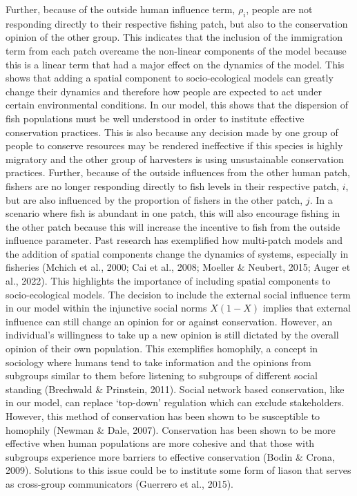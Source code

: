 \documentclass[
  12pt,
]{article}
\begin{document}
Further, because of the outside human influence term, \(\rho_i\), people are not responding directly to their respective fishing patch, but also to the conservation opinion of the other group. This indicates that the inclusion of the immigration term from each patch overcame the non-linear components of the model because this is a linear term that had a major effect on the dynamics of the model. This shows that adding a spatial component to socio-ecological models can greatly change their dynamics and therefore how people are expected to act under certain environmental conditions. In our model, this shows that the dispersion of fish populations must be well understood in order to institute effective conservation practices. This is also because any decision made by one group of people to conserve resources may be rendered ineffective if this species is highly migratory and the other group of harvesters is using unsustainable conservation practices. Further, because of the outside influences from the other human patch, fishers are no longer responding directly to fish levels in their respective patch, \(i\), but are also influenced by the proportion of fishers in the other patch, \(j\). In a scenario where fish is abundant in one patch, this will also encourage fishing in the other patch because this will increase the incentive to fish from the outside influence parameter. Past research has exemplified how multi-patch models and the addition of spatial components change the dynamics of systems, especially in fisheries (Mchich et al., 2000; Cai et al., 2008; Moeller \& Neubert, 2015; Auger et al., 2022). This highlights the importance of including spatial components to socio-ecological models.
The decision to include the external social influence term in our model within the injunctive social norms \(X(1-X)\) implies that external influence can still change an opinion for or against conservation. However, an individual's willingness to take up a new opinion is still dictated by the overall opinion of their own population. This exemplifies homophily, a concept in sociology where humans tend to take information and the opinions from subgroups similar to them before listening to subgroups of different social standing (Brechwald \& Prinstein, 2011). Social network based conservation, like in our model, can replace `top-down' regulation which can exclude stakeholders. However, this method of conservation has been shown to be susceptible to homophily (Newman \& Dale, 2007). Conservation has been shown to be more effective when human populations are more cohesive and that those with subgroups experience more barriers to effective conservation (Bodin \& Crona, 2009). Solutions to this issue could be to institute some form of liason that serves as cross-group communicators (Guerrero et al., 2015).
\end{document}
